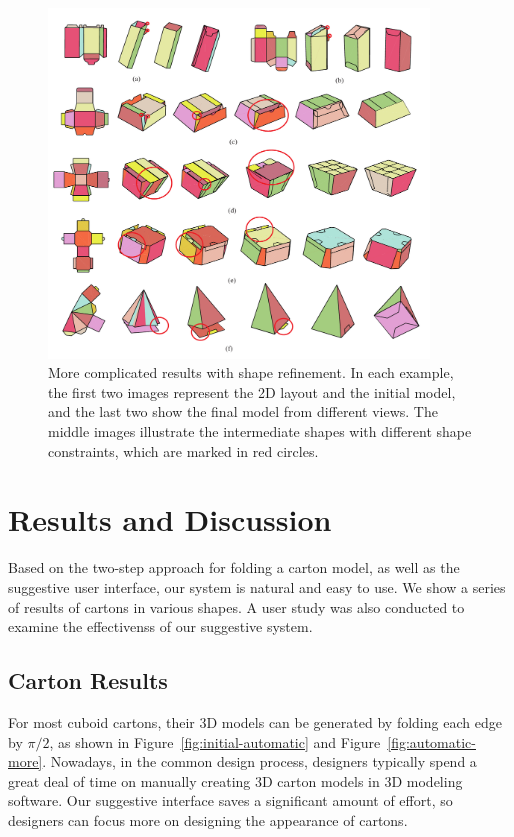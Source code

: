 \begin{figure}[h]
	\centering
	\includegraphics[width=0.9\textwidth]{images/newMore}
	\caption{More complicated results with shape refinement. In each example, the first two images represent the 2D layout and the initial model, and the last two show the final model from different views. The middle images illustrate the intermediate shapes with different shape constraints, which are marked in red circles.}
	\label{fig:result-more}
\end{figure}


\section{Results and Discussion}\label{sec:result}


Based on the two-step approach for folding a carton model, as well as the suggestive user interface, our system is natural and easy to use. 
%
We show a series of results of cartons in various shapes. 
%
A user study was also conducted to examine the effectivenss of our suggestive system.


\subsection{Carton Results}


For most cuboid cartons, their 3D models can be generated by folding each edge by $\pi/2$, as shown in Figure~\ref{fig:initial-automatic} and Figure~\ref{fig:automatic-more}.
%
Nowadays, in the common design process, designers typically spend a great deal of time on manually creating 3D carton models in 3D modeling software. 
Our suggestive interface saves a significant amount of effort, so designers can focus more on designing the appearance of cartons. 


